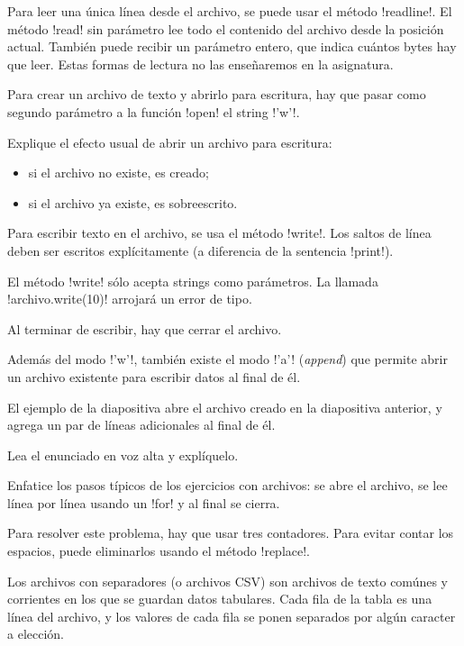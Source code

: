 \documentclass[10pt]{article}
\begin{document}
   Para leer una única línea desde el archivo,
   se puede usar el método \li!readline!.
   El método \li!read! sin parámetro lee todo el contenido del archivo
   desde la posición actual.
   También puede recibir un parámetro entero,
   que indica cuántos bytes hay que leer.
   Estas formas de lectura no las enseñaremos en la asignatura.


  Para crear un archivo de texto y abrirlo para escritura,
  hay que pasar como segundo parámetro a la función \li!open!
  el string \li!'w'!.

  Explique el efecto usual de abrir un archivo para escritura:
  \begin{itemize}
    \item si el archivo no existe, es creado;
    \item si el archivo ya existe, es sobreescrito.
  \end{itemize}

  Para escribir texto en el archivo,
  se usa el método \li!write!.
  Los saltos de línea deben ser escritos explícitamente
  (a diferencia de la sentencia \li!print!).

  El método \li!write! sólo acepta strings como parámetros.
  La llamada \li!archivo.write(10)! arrojará un error de tipo.

  Al terminar de escribir,
  hay que cerrar el archivo.


  Además del modo \li!'w'!, también existe el modo \li!'a'! (\emph{append})
  que permite abrir un archivo existente
  para escribir datos al final de él.

  El ejemplo de la diapositiva abre el archivo creado en la diapositiva anterior,
  y agrega un par de líneas adicionales al final de él.


  Lea el enunciado en voz alta y explíquelo.

  Enfatice los pasos típicos de los ejercicios con archivos:
  se abre el archivo, se lee línea por línea usando un \li!for!
  y al final se cierra.

  Para resolver este problema,
  hay que usar tres contadores.
  Para evitar contar los espacios,
  puede eliminarlos usando el método \li!replace!.


  Los archivos con separadores (o archivos CSV)
  son archivos de texto comúnes y corrientes
  en los que se guardan datos tabulares.
  Cada fila de la tabla es una línea del archivo,
  y los valores de cada fila se ponen separados por algún caracter a elección.
\end{document}

